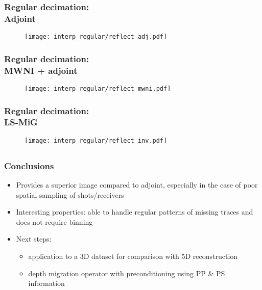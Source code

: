 \begin{frame}
\frametitle{Regular decimation:\\Adjoint}
\begin{figure} 
\texttt{[image: interp\_regular/reflect\_adj.pdf]} \\
\end{figure} 
\end{frame}

\begin{frame}
\frametitle{Regular decimation:\\MWNI + adjoint}
\begin{figure} 
\texttt{[image: interp\_regular/reflect\_mwni.pdf]} \\
\end{figure} 
\end{frame}

\begin{frame}
\frametitle{Regular decimation:\\LS-MiG}
\begin{figure} 
\texttt{[image: interp\_regular/reflect\_inv.pdf]} \\
\end{figure} 
\end{frame}

\begin{frame}
\section[Conclusions]{}
\frametitle{Conclusions}
  \begin{itemize}
  \item Provides a superior image compared to adjoint, especially in the case of poor spatial sampling of shots/receivers
  \item Interesting properties: able to handle regular patterns of missing traces and does not require binning
  \item Next steps: 
\begin{itemize}
\item application to a 3D dataset for comparison with 5D reconstruction
\item depth migration operator with preconditioning using PP \& PS information 
\end{itemize}
  \end{itemize}
\end{frame}



